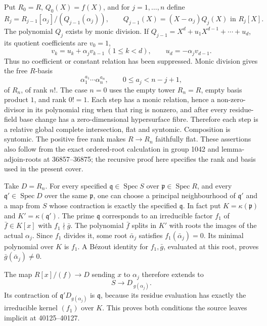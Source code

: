 Put \(R_0=R\), \(Q_0(X)=f(X)\), and for \(j=1,\ldots,n\) define \[
R_j=R_{j-1}[\alpha_j]/(Q_{j-1}(\alpha_j)),
\qquad
Q_{j-1}(X)=(X-\alpha_j)Q_j(X)\text{ in }R_j[X].
\] The polynomial \(Q_j\) exists by monic division. If \(Q_{j-1}=X^d+u_1X^{d-1}+\cdots+u_d\), its quotient coefficients are \(v_0=1\), \[
v_k=u_k+\alpha_jv_{k-1}\ (1\le k<d),
\qquad u_d=-\alpha_jv_{d-1}.
\] Thus no coefficient or constant relation has been suppressed. Monic division gives the free \(R\)-basis \[
\alpha_1^{a_1}\cdots\alpha_n^{a_n},
\qquad 0\le a_j<n-j+1,
\] of \(R_n\), of rank \(n!\). The case \(n=0\) uses the empty tower \(R_n=R\), empty basis product \(1\), and rank \(0!=1\). Each step has a monic relation, hence a non-zero-divisor in its polynomial ring when that ring is nonzero, and after every residue-field base change has a zero-dimensional hypersurface fibre. Therefore each step is a relative global complete intersection, flat and syntomic. Composition is syntomic. The positive free rank makes \(R\to R_n\) faithfully flat. These assertions also follow from the exact ordered-root calculation in group 1042 and lemma-\AlgebraIdentifierBreak{}adjoin-\AlgebraIdentifierBreak{}roots at 36857--36875; the recursive proof here specifies the rank and basis used in the present cover.

Take \(D=R_n\). For every specified \(\mathfrak q\in\operatorname{Spec}S\) over \(\mathfrak p\in\operatorname{Spec}R\), and every \(\mathfrak q'\in\operatorname{Spec}D\) over the same \(\mathfrak p\), one can choose a principal neighbourhood of \(\mathfrak q'\) and a map from \(S\) whose contraction is exactly the specified \(\mathfrak q\). In fact put \(K=\kappa(\mathfrak p)\) and \(K'=\kappa(\mathfrak q')\). The prime \(\mathfrak q\) corresponds to an irreducible factor \(f_1\) of \(\bar f\in K[x]\) with \(f_1\nmid\bar g\). The polynomial \(\bar f\) splits in \(K'\) with roots the images of the actual \(\alpha_j\). Since \(f_1\) divides it, some root \(\bar\alpha_j\) satisfies \(f_1(\bar\alpha_j)=0\). Its minimal polynomial over \(K\) is \(f_1\). A Bézout identity for \(f_1,\bar g\), evaluated at this root, proves \(\bar g(\bar\alpha_j)\ne0\).

The map \(R[x]/(f)\to D\) sending \(x\) to \(\alpha_j\) therefore extends to \[
S\longrightarrow D_{\,g(\alpha_j)}.
\] Its contraction of \(\mathfrak q'D_{g(\alpha_j)}\) is \(\mathfrak q\), because its residue evaluation has exactly the irreducible kernel \((f_1)\) over \(K\). This proves both conditions the source leaves implicit at 40125--40127.

